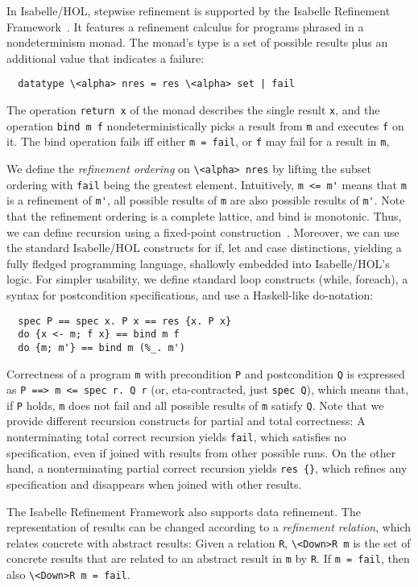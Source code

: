 \documentclass[smallcondensed]{svjour3}     %
\newcommand{\isai}{\lstinline[language=isabelle,basicstyle=\normalsize\ttfamily\slshape]}
\begin{document}
In Isabelle/HOL, stepwise refinement is supported by the Isabelle Refinement Framework~\cite{LaTu12,La12}. 
It features a refinement calculus for programs phrased in a nondeterminism monad. 
The monad's type is a set of possible results plus an additional value that indicates a failure:
\begin{lstlisting}
  datatype \<alpha> nres = res \<alpha> set | fail
\end{lstlisting}
The operation \isai{return x} of the monad describes the single result \isai{x}, and the 
operation \isai{bind m f} nondeterministically picks a result from \isai{m} and executes \isai{f} on it. 
The bind operation fails iff either \isai{m = fail}, or \isai{f} may fail for a result in \isai{m}, 

We define the \emph{refinement ordering} on \isai{\<alpha> nres} by lifting the subset ordering with \isai{fail} being the greatest element.
Intuitively, \isai{m <= m'} means that \isai{m} is a refinement of \isai{m'}, \ie all possible results of \isai{m} are 
also possible results of \isai{m'}. 
Note that the refinement ordering is a complete lattice, and bind is monotonic. Thus, we can define recursion using a fixed-point construction~\cite{Kr10}.
Moreover, we can use the standard Isabelle/HOL constructs for if, let and case distinctions, yielding a fully fledged programming 
language, shallowly embedded into Isabelle/HOL's logic. For simpler usability, we define standard loop constructs (while, foreach), 
a syntax for postcondition specifications, and use a Haskell-like do-notation:
\begin{lstlisting}
  spec P == spec x. P x == res {x. P x}
  do {x <- m; f x} == bind m f
  do {m; m'} == bind m (%_. m')
\end{lstlisting}

Correctness of a program \isai{m} with precondition \isai{P} and postcondition \isai{Q} is expressed as \isai{P ==> m <= spec r. Q r} (or, eta-contracted, just \isai{spec Q}), which
means that, if \isai{P} holds, \isai{m} does not fail and all possible results of \isai{m} satisfy \isai{Q}. Note that we provide different recursion constructs
for partial and total correctness: A nonterminating total correct recursion yields \isai{fail}, which satisfies no specification, even if joined 
with results from other possible runs. On the other hand, a nonterminating partial correct recursion yields \isai|res {}|, which refines any specification 
and disappears when joined with other results.

The Isabelle Refinement Framework also supports data refinement. The representation of results can be changed according to a \emph{refinement relation}, 
which relates concrete with abstract results: Given a relation \isai{R}, \isai{\<Down>R m} is the set of concrete results that are related to an 
abstract result in \isai{m} by \isai{R}. If \isai{m = fail}, then also \isai{\<Down>R m = fail}.
\end{document}
